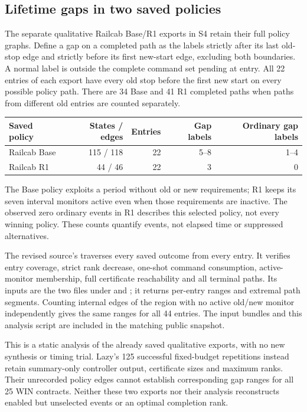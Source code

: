 \subsection{Lifetime gaps in two saved policies}\label{ta:saved-gaps}
The separate qualitative Railcab Base/R1 exports in S4 retain their full policy graphs. Define a gap on a completed path as the labels strictly after its last old-stop edge and strictly before its first new-start edge, excluding both boundaries. A normal label is outside the complete command set pending at entry. All 22 entries of each export have every old stop before the first new start on every possible policy path. There are 34 Base and 41 R1 completed paths when paths from different old entries are counted separately.
\begin{center}\small
\begin{tabular}{@{}lrrrr@{}}\toprule
Saved policy & States / edges & Entries & Gap labels & Ordinary gap labels\\\midrule
Railcab Base & 115 / 118 & 22 & 5--8 & 1--4\\
Railcab R1 & 44 / 46 & 22 & 3 & 0\\\bottomrule
\end{tabular}
\end{center}
The Base policy exploits a period without old or new requirements; R1 keeps its seven interval monitors active even when those requirements are inactive. The observed zero ordinary events in R1 describes this selected policy, not every winning policy. These counts quantify events, not elapsed time or suppressed alternatives.

The revised source's  traverses every saved outcome from every entry. It verifies entry coverage, strict rank decrease, one-shot command consumption, active-monitor membership, full certificate reachability and all terminal paths. Its inputs are the two  files under  and ; it returns per-entry ranges and extremal path segments. Counting internal edges of the region with no active old/new monitor independently gives the same ranges for all 44 entries. The input bundles and this analysis script are included in the matching public snapshot.

This is a static analysis of the already saved qualitative exports, with no new synthesis or timing trial. Lazy's 125 successful fixed-budget repetitions instead retain summary-only controller output, certificate sizes and maximum ranks. Their unrecorded policy edges cannot establish corresponding gap ranges for all 25 WIN contracts. Neither these two exports nor their analysis reconstructs enabled but unselected events or an optimal completion rank.
